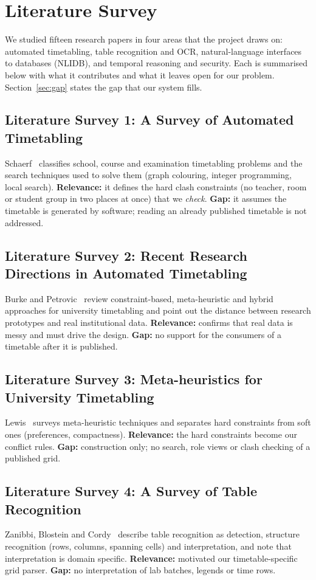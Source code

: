 \section{Literature Survey}
We studied fifteen research papers in four areas that the project draws on: automated timetabling,
table recognition and OCR, natural-language interfaces to databases (NLIDB), and temporal reasoning
and security. Each is summarised below with what it contributes and what it leaves open for our
problem. Section~\ref{sec:gap} states the gap that our system fills.

\subsection{Literature Survey 1: A Survey of Automated Timetabling}
Schaerf~\cite{schaerf1999} classifies school, course and examination timetabling problems and the
search techniques used to solve them (graph colouring, integer programming, local search).
\textbf{Relevance:} it defines the hard clash constraints (no teacher, room or student group in two
places at once) that we \emph{check}. \textbf{Gap:} it assumes the timetable is generated by software;
reading an already published timetable is not addressed.

\subsection{Literature Survey 2: Recent Research Directions in Automated Timetabling}
Burke and Petrovic~\cite{burke2002} review constraint-based, meta-heuristic and hybrid approaches for
university timetabling and point out the distance between research prototypes and real institutional
data. \textbf{Relevance:} confirms that real data is messy and must drive the design. \textbf{Gap:} no
support for the consumers of a timetable after it is published.

\subsection{Literature Survey 3: Meta-heuristics for University Timetabling}
Lewis~\cite{lewis2008} surveys meta-heuristic techniques and separates hard constraints from soft ones
(preferences, compactness). \textbf{Relevance:} the hard constraints become our conflict rules.
\textbf{Gap:} construction only; no search, role views or clash checking of a published grid.

\subsection{Literature Survey 4: A Survey of Table Recognition}
Zanibbi, Blostein and Cordy~\cite{zanibbi2004} describe table recognition as detection, structure
recognition (rows, columns, spanning cells) and interpretation, and note that interpretation is domain
specific. \textbf{Relevance:} motivated our timetable-specific grid parser. \textbf{Gap:} no
interpretation of lab batches, legends or time rows.

